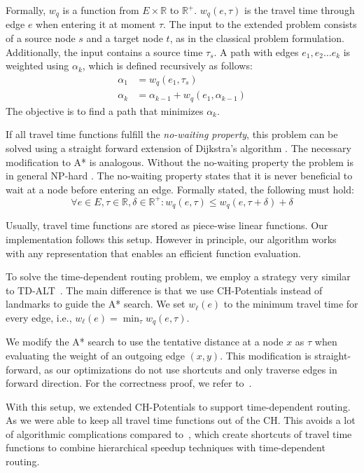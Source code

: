 \documentclass[letterpaper]{article} %
\begin{document}
Formally, $w_q$ is a function from $E\times \mathbb{R}$ to $\mathbb{R}^+$.
$w_q(e, \tau)$ is the travel time through edge $e$ when entering it at moment $\tau$.
The input to the extended problem consists of a source node $s$ and a target node $t$, as in the classical problem formulation.
Additionally, the input contains a source time $\tau_s$.
A path with edges $e_1,e_2\ldots e_k$ is weighted using $\alpha_k$, which is defined recursively as follows:\[
\begin{split}
\alpha_{1} & = w_q(e_1, \tau_s) \\
\alpha_{k} & = \alpha_{k-1} + w_q(e_1, \alpha_{k-1})
\end{split}
\]
The objective is to find a path that minimizes $\alpha_k$.

If all travel time functions fulfill the \emph{no-waiting property}, this problem can be solved using a straight forward extension of Dijkstra's algorithm \cite{d-aassp-69}.
The necessary modification to A* is analogous.
Without the no-waiting property the problem is in general NP-hard \cite{or-tnp-89}.
The no-waiting property states that it is never beneficial to wait at a node before entering an edge.
Formally stated, the following must hold:\[
\forall e\in E,\tau\in \mathbb{R},\delta\in \mathbb{R}^+: w_q(e, \tau) \le w_q(e, \tau+\delta) + \delta
\]

Usually, travel time functions are stored as piece-wise linear functions.
Our implementation follows this setup.
However in principle, our algorithm works with any representation that enables an efficient function evaluation.

To solve the time-dependent routing problem, we employ a strategy very similar to TD-ALT~\cite{ndls-bastd-12}.
The main difference is that we use CH-Potentials instead of landmarks to guide the A* search.
We set $w_\ell(e)$ to the minimum travel time for every edge, i.e., $w_\ell(e) = \min_\tau w_q(e,\tau)$.

We modify the A* search to use the tentative distance at a node $x$ as $\tau$ when evaluating the weight of an outgoing edge $(x,y)$.
This modification is straight-forward, as our optimizations do not use shortcuts and only traverse edges in forward direction.
For the correctness proof, we refer to~\cite{dw-lbrdg-07}.

With this setup, we extended CH-Potentials to support time-dependent routing.
As we were able to keep all travel time functions out of the CH.
This avoids a lot of algorithmic complications compared to~\cite{bgsv-mtdtt-13,bdpw-dtdrp-16,swz-sfert-19}, which create shortcuts of travel time functions to combine hierarchical speedup techniques with time-dependent routing.
\end{document}
